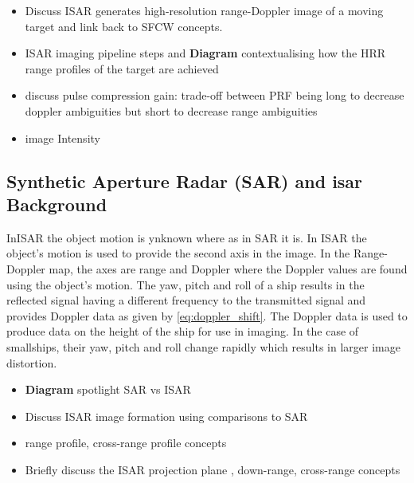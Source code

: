 \documentclass[class=report,11pt,crop=false]{standalone}
\begin{document}
    \begin{itemize}
        \item Discuss ISAR generates high-resolution range-Doppler image of a moving target and link back to SFCW concepts. %
        \item  ISAR imaging pipeline steps %
        and \textbf{Diagram} contextualising how the HRR range profiles of the target are achieved %
        \item discuss pulse compression gain: trade-off between PRF being long to decrease doppler ambiguities but short to decrease range ambiguities
        \item image Intensity
    \end{itemize}

    \subsection{Synthetic Aperture Radar (SAR) and \gls{isar} Background } %
    InISAR the object motion is ynknown where as in SAR it is. In ISAR the object's motion is used to provide the second axis in the image. In the Range-Doppler map, the axes are range and Doppler where the Doppler values are found using the object's motion. The yaw, pitch and roll of a ship results in the reflected signal having a different frequency to the transmitted signal and provides Doppler data as given by \autoref{eq:doppler_shift}. The Doppler data is used to produce data on the height of the ship for use in imaging. In the case of smallships, their yaw, pitch and roll change rapidly which results in larger image distortion. %
        \begin{itemize}
            \item \textbf{Diagram} spotlight SAR vs ISAR
            \item Discuss ISAR image formation using comparisons to SAR
            \item range profile, cross-range profile concepts
            \item Briefly discuss the ISAR projection plane%
            , down-range, cross-range concepts %
        \end{itemize}
    
\end{document}

